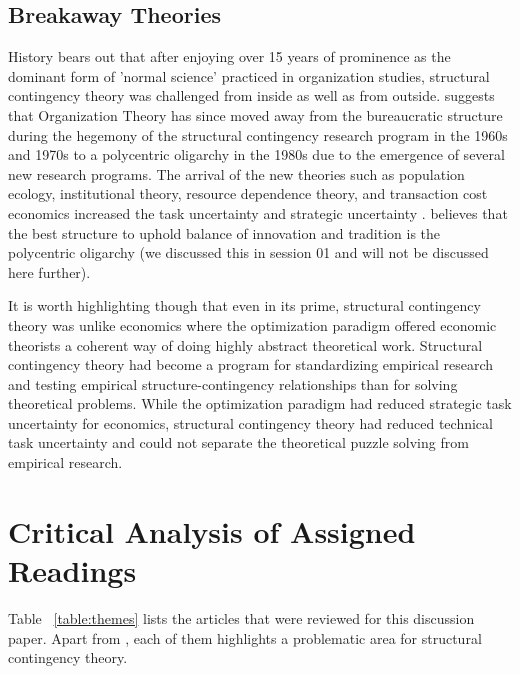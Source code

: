 \documentclass[12pt]{article}
\begin{document}
\subsection{Breakaway Theories}
History bears  out  that after enjoying over 15 years of prominence as the dominant form of 'normal science' \citep{Kuhn1970} practiced in organization studies, structural contingency theory was challenged from inside as well as from outside. \cite{Knudsen2005} suggests that Organization Theory has since moved away from the bureaucratic structure during the hegemony of the structural contingency research program in the 1960\textquotesingle s and 1970\textquotesingle s to a polycentric oligarchy in the 1980\textquotesingle s due to the emergence of several new research programs. The arrival of the new theories such as population ecology, institutional theory, resource dependence theory, and transaction cost economics increased the task uncertainty and strategic uncertainty \citep{Whitley2000}. \cite{Knudsen2005} believes that the best structure to uphold balance of innovation and tradition is the polycentric oligarchy (we discussed this in session 01 and will not be discussed here further).

It is worth highlighting though that even in its prime,  structural contingency theory was unlike economics where the optimization paradigm offered economic theorists a coherent way of doing highly abstract theoretical work. Structural contingency theory had become a program for standardizing empirical research and testing empirical structure-contingency relationships than for solving theoretical problems. While the optimization paradigm had reduced strategic task uncertainty for economics,  structural contingency theory had reduced technical task uncertainty  and could not separate the theoretical puzzle solving from empirical research. 


\section{Critical Analysis of Assigned Readings}
Table ~\ref{table:themes}  lists the articles that were reviewed for this discussion paper. Apart from \cite{Donaldson1987}, each of them highlights a problematic area for structural contingency theory.
\end{document}
